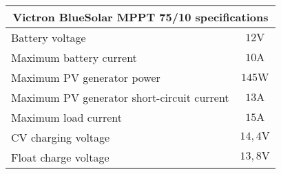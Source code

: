 \footnotesize
\begin{tabular}{|l|c|}
	\hline
	\multicolumn{2}{|c|}{\textbf{Victron BlueSolar MPPT 75/10 specifications}} \\
	\hline
	Battery voltage & $12\mathrm{V}$ \\
	Maximum battery current & $10\mathrm{A}$ \\
	Maximum PV generator power & $145\mathrm{W}$\\
	Maximum PV generator short-circuit current & $13\mathrm{A}$ \\
	Maximum load current & $15\mathrm{A}$ \\
	CV charging voltage & $14,4\mathrm{V}$ \\
	Float charge voltage & $13,8\mathrm{V}$ \\
	\hline
\end{tabular}